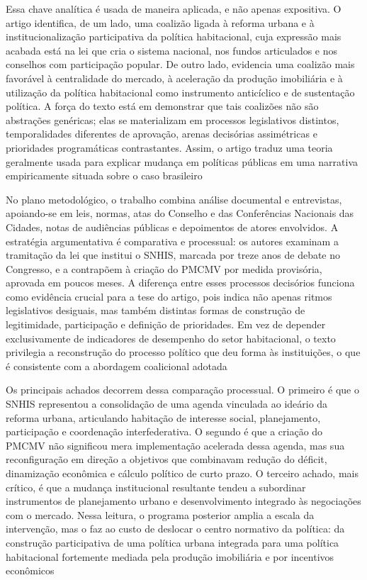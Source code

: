 \documentclass[12pt,a4paper]{article}
\begin{document}
Essa chave analítica é usada de maneira aplicada, e não apenas expositiva. O artigo identifica, de um lado, uma coalizão ligada à reforma urbana e à institucionalização participativa da política habitacional, cuja expressão mais acabada está na lei que cria o sistema nacional, nos fundos articulados e nos conselhos com participação popular. De outro lado, evidencia uma coalizão mais favorável à centralidade do mercado, à aceleração da produção imobiliária e à utilização da política habitacional como instrumento anticíclico e de sustentação política. A força do texto está em demonstrar que tais coalizões não são abstrações genéricas; elas se materializam em processos legislativos distintos, temporalidades diferentes de aprovação, arenas decisórias assimétricas e prioridades programáticas contrastantes. Assim, o artigo traduz uma teoria geralmente usada para explicar mudança em políticas públicas em uma narrativa empiricamente situada sobre o caso brasileiro\parencite{ferreira2019_politica_habitacional}

No plano metodológico, o trabalho combina análise documental e entrevistas, apoiando-se em leis, normas, atas do Conselho e das Conferências Nacionais das Cidades, notas de audiências públicas e depoimentos de atores envolvidos. A estratégia argumentativa é comparativa e processual: os autores examinam a tramitação da lei que institui o SNHIS, marcada por treze anos de debate no Congresso, e a contrapõem à criação do PMCMV por medida provisória, aprovada em poucos meses. A diferença entre esses processos decisórios funciona como evidência crucial para a tese do artigo, pois indica não apenas ritmos legislativos desiguais, mas também distintas formas de construção de legitimidade, participação e definição de prioridades. Em vez de depender exclusivamente de indicadores de desempenho do setor habitacional, o texto privilegia a reconstrução do processo político que deu forma às instituições, o que é consistente com a abordagem coalicional adotada\parencite{ferreira2019_politica_habitacional}

Os principais achados decorrem dessa comparação processual. O primeiro é que o SNHIS representou a consolidação de uma agenda vinculada ao ideário da reforma urbana, articulando habitação de interesse social, planejamento, participação e coordenação interfederativa. O segundo é que a criação do PMCMV não significou mera implementação acelerada dessa agenda, mas sua reconfiguração em direção a objetivos que combinavam redução do déficit, dinamização econômica e cálculo político de curto prazo. O terceiro achado, mais crítico, é que a mudança institucional resultante tendeu a subordinar instrumentos de planejamento urbano e desenvolvimento integrado às negociações com o mercado. Nessa leitura, o programa posterior amplia a escala da intervenção, mas o faz ao custo de deslocar o centro normativo da política: da construção participativa de uma política urbana integrada para uma política habitacional fortemente mediada pela produção imobiliária e por incentivos econômicos\parencite{ferreira2019_politica_habitacional}
\end{document}
